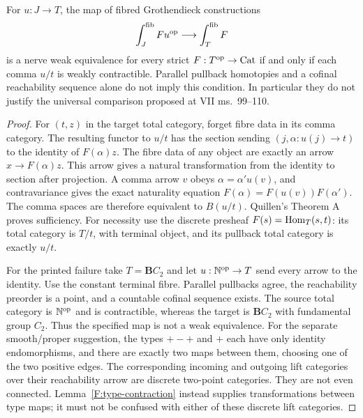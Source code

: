 \begin{proposition}
\label{F:C23-uniform}
For $u:J\to T$, the map of fibred Grothendieck constructions
\[
 \int_J^{\mathrm{fib}}F u^{\mathrm {op}}\longrightarrow
 \int_T^{\mathrm{fib}}F
\]
is a nerve weak equivalence for every strict $F:T^{\mathrm {op}}\to\mathrm {Cat}$
if and only if each comma $u/t$ is weakly contractible. Parallel
pullback homotopies and a cofinal reachability sequence alone do not
imply this condition. In particular they do not justify the universal
comparison proposed at VII ms.~99--110.
\end{proposition}
\begin{proof}
For $(t,z)$ in the target total category, forget fibre data in its
comma category. The resulting functor to $u/t$ has the section sending
$(j,\alpha:u(j)\to t)$ to the identity of $F(\alpha)z$.
The fibre data of any object are exactly an arrow
$x\to F(\alpha)z$. This arrow gives a natural transformation from
the identity to section after projection. A comma arrow $v$ obeys
$\alpha=\alpha'u(v)$, and contravariance gives the exact naturality
equation $F(\alpha)=F(u(v))F(\alpha')$. The comma spaces are therefore
equivalent to $B(u/t)$. Quillen's Theorem A proves sufficiency.
For necessity use the discrete presheaf $F(s)=\operatorname{Hom}_T(s,t)$: its
total category is $T/t$, with terminal object, and its pullback total
category is exactly $u/t$.

For the printed failure take $T=\mathbf BC_2$ and let
$u:\mathbb N^{\mathrm {op}}\to T$ send every arrow to the identity. Use the constant
terminal fibre. Parallel pullbacks agree, the reachability preorder
is a point, and a countable cofinal sequence exists. The source total
category is $\mathbb N^{\mathrm {op}}$ and is contractible, whereas the target is
$\mathbf BC_2$ with fundamental group $C_2$. Thus the specified map
is not a weak equivalence. For the separate smooth/proper suggestion,
the types $+-+$ and $+$ each have only identity endomorphisms, and
there are exactly two maps between them, choosing one of the two
positive edges. The corresponding incoming and outgoing lift
categories over their reachability arrow are discrete two-point
categories. They are not even connected. Lemma~\ref{F:type-contraction}
instead supplies transformations between type maps; it must not be
confused with either of these discrete lift categories.
\end{proof}

